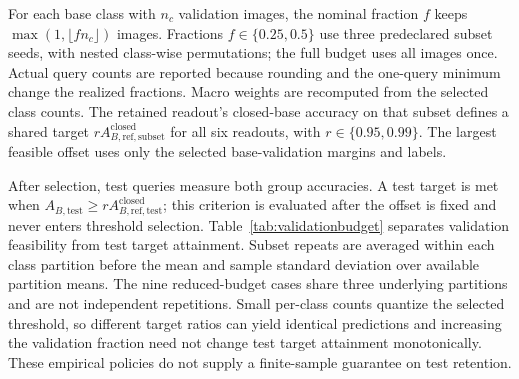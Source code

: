 \documentclass[preprint,review,12pt]{elsarticle}
\begin{document}
For each base class with $n_c$ validation images, the nominal fraction $f$ keeps
$\max(1,\lfloor f n_c\rfloor)$ images. Fractions $f\in\{0.25,0.5\}$ use three
predeclared subset seeds, with nested class-wise permutations; the full budget
uses all images once. Actual query counts are reported because rounding and the
one-query minimum change the realized fractions. Macro weights are recomputed
from the selected class counts. The retained readout's closed-base accuracy on
that subset defines a shared target $rA_{B,\mathrm{ref},\mathrm{subset}}^{\mathrm{closed}}$
for all six readouts, with $r\in\{0.95,0.99\}$. The largest feasible offset uses
only the selected base-validation margins and labels.

After selection, test queries measure both group accuracies. A test target is
met when $A_{B,\mathrm{test}}\geq
rA_{B,\mathrm{ref},\mathrm{test}}^{\mathrm{closed}}$; this criterion is evaluated
after the offset is fixed and never enters threshold selection. Table~\ref{tab:validationbudget}
separates validation feasibility from test target attainment. Subset repeats are
averaged within each class partition before the mean and sample standard
deviation over available partition means. The nine reduced-budget cases share
three underlying partitions and are not independent repetitions. Small
per-class counts quantize the selected threshold, so different target ratios can
yield identical predictions and increasing the validation fraction need not
change test target attainment monotonically. These empirical policies do not
supply a finite-sample guarantee on test retention.

\begin{table}[htbp]
\centering
\caption{Retained readout under different validation-query budgets after the final arrival. Accuracies are percentages, mean $\pm$ partition-level sample standard deviation after averaging subset repeats. Queries gives the actual old-class validation count range. Val. feasible counts partition/subset combinations meeting the validation constraint; Test met counts feasible combinations meeting the separate test criterion. The full budget uses one subset per partition.}
\label{tab:validationbudget}
\resizebox{\linewidth}{!}{}
\end{table}

\begin{table}[htbp]
\centering
\caption{All readouts at the nominal 25\% validation-query budget and 95\% target after the final arrival. All classifiers, mixtures and cache settings are held fixed from the original five-shot calibration. Accuracy aggregation and feasibility/attainment counts follow Table~\ref{tab:validationbudget}. Missing metrics correspond to zero feasible subsets.}
\label{tab:validationbudgetcomparators}
\resizebox{\linewidth}{!}{}
\end{table}
\end{document}
